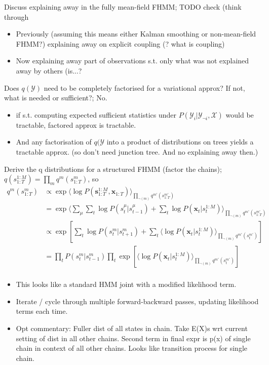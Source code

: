 \documentclass{article}
\begin{document}
Discuss explaining away in the fully mean-field FHMM; TODO check (think through \begin{itemize} \item Previously (assuming this means either Kalman smoothing or non-mean-field FHMM?) explaining away on explicit coupling (? what is coupling) \item Now explaining away part of observations s.t. only what was not explained away by others (is...?  \end{itemize}

Does $q(\mathcal{Y})$ need to be completely factorised for a variational approx? If not, what is needed or sufficient?; No. \begin{itemize} \item if s.t. computing expected sufficient statistics under $P(\mathcal{Y}_i|\mathcal{Y}_{\neg i}, \mathcal{X})$ would be tractable, factored approx is tractable. \item And any factorisation of $q(\mathcal{Y}$ into a product of distributions on trees yields a tractable approx. (so don't need junction tree. And no explaining away then.) \end{itemize}

Derive the q distributions for a structured FHMM (factor the chains); $q(s^{1:M}_{1:T}) = \prod_mq^m(s^m_{1:T})$, so \begin{align*} q^m(s^m_{1:T})&\propto \exp \langle \log P(\bm{s}^{1:M}_{1:T}, \bm{x}_{1:T})\rangle_{\prod_{\neg (m)}q^{m'}(s^{m'}_{1:T})} \\ &= \exp \langle \sum_{\mu}\sum_t\log P(s^\mu_t|s^\mu_{t-1}) + \sum_t\log P(\bm{x}_t|s^{1:M}_t)\rangle_{\prod_{\neg (m)}q^{m'}(s^{m'}_{1:T})} \\ &\propto \exp [ \sum_t\log P(s^m_t|s^m_{t+1}) + \sum_t\langle\log P(\bm{x}_t|s^{1:M}_t)\rangle_{\prod_{\neg (m)}q^{m'}(s^{m'}_{t})}] \\ &= \prod_t P(s^m_t|s^m_{t-1})\prod_t \exp[\langle \log P(\bm{x}_t|s^{1:M}_t)\rangle_{\prod_{\neg (m)}q^{m'}(s^{m'}_{t})}] \\ \end{align*} \begin{itemize} \item This looks like a standard HMM joint with a modified likelihood term.  \item Iterate / cycle through multiple forward-backward passes, updating likelihood terms each time.  \item Opt commentary: Fuller dist of all states in chain. Take E(X)s wrt current setting of dist in all other chains. Second term in final expr is p(x) of single chain in context of all other chains. Looks like transition process for single chain.  \end{itemize}
\end{document}
